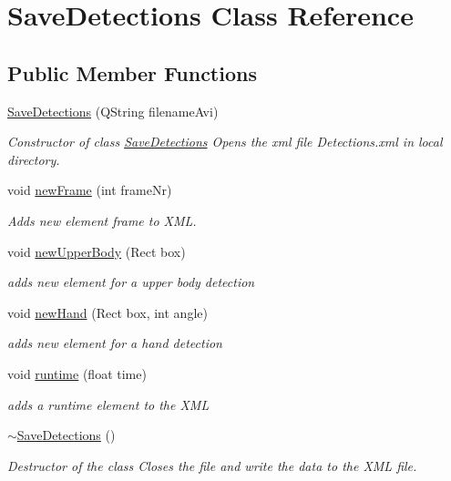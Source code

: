 \hypertarget{class_save_detections}{\section{Save\-Detections Class Reference}
\label{class_save_detections}
}
\subsection*{Public Member Functions}
\begin{DoxyCompactItemize}
\item 
\hyperlink{class_save_detections_a3583bd8066410a896ca4fb2891ea08ef}{Save\-Detections} (Q\-String filename\-Avi)
\begin{DoxyCompactList}\small\item\em Constructor of class \hyperlink{class_save_detections}{Save\-Detections} Opens the xml file Detections.\-xml in local directory. \end{DoxyCompactList}\item 
void \hyperlink{class_save_detections_a5a0112af80a6f2c7e5e0c12c757e3da9}{new\-Frame} (int frame\-Nr)
\begin{DoxyCompactList}\small\item\em Adds new element frame to X\-M\-L. \end{DoxyCompactList}\item 
void \hyperlink{class_save_detections_acb1e8a18ffa4410a638a47c32314839e}{new\-Upper\-Body} (Rect box)
\begin{DoxyCompactList}\small\item\em adds new element for a upper body detection \end{DoxyCompactList}\item 
void \hyperlink{class_save_detections_ae1e14c331963242bb037abe2cb14bb84}{new\-Hand} (Rect box, int angle)
\begin{DoxyCompactList}\small\item\em adds new element for a hand detection \end{DoxyCompactList}\item 
void \hyperlink{class_save_detections_a6bc172c27da2231a4677c73efb967946}{runtime} (float time)
\begin{DoxyCompactList}\small\item\em adds a runtime element to the X\-M\-L \end{DoxyCompactList}\item 
\hypertarget{class_save_detections_a0dbc57c6c8ea4096bce1e4b640d697eb}{\hyperlink{class_save_detections_a0dbc57c6c8ea4096bce1e4b640d697eb}{$\sim$\-Save\-Detections} ()}\label{class_save_detections_a0dbc57c6c8ea4096bce1e4b640d697eb}

\begin{DoxyCompactList}\small\item\em Destructor of the class Closes the file and write the data to the X\-M\-L file. \end{DoxyCompactList}\end{DoxyCompactItemize}


